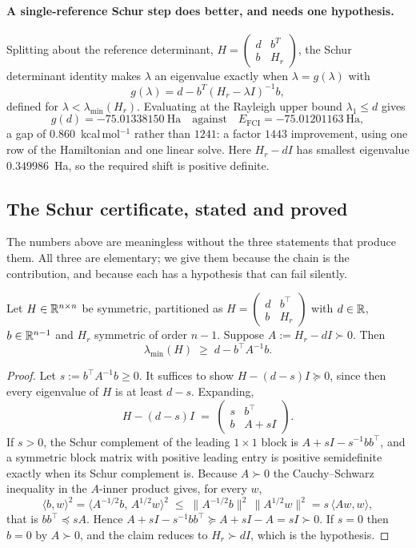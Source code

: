 \paragraph{A single-reference Schur step does better, and needs one hypothesis.}
Splitting about the reference determinant, $H = \begin{pmatrix} d & b^T\\
b & H_r\end{pmatrix}$, the Schur determinant identity makes $\lambda$ an
eigenvalue exactly when $\lambda = g(\lambda)$ with
\[
  g(\lambda) = d - b^T (H_r-\lambda I)^{-1} b ,
\]
defined for $\lambda<\lambda_{\min}(H_r)$. Evaluating at the Rayleigh upper bound
$\lambda_1\le d$ gives
\[
  g(d) = -75.01338150\ \text{Ha}
  \quad\text{against}\quad
  E_{\mathrm{FCI}} = -75.01201163\ \text{Ha},
\]
a gap of $0.860$~kcal\,mol$^{-1}$ rather than $1241$: a factor $1443$ improvement,
using one row of the Hamiltonian and one linear solve. Here
$H_r-dI$ has smallest eigenvalue $0.349986$~Ha, so the required shift is positive
definite.

\subsection{The Schur certificate, stated and proved}
\label{sec:schur-proof}

The numbers above are meaningless without the three statements that produce them.
All three are elementary; we give them because the chain is the contribution, and
because each has a hypothesis that can fail silently.

\begin{proposition}
\label{prop:schur}
Let $H\in\mathbb{R}^{n\times n}$ be symmetric, partitioned as
$H=\begin{pmatrix} d & b^\top\\ b & H_r\end{pmatrix}$ with $d\in\mathbb{R}$,
$b\in\mathbb{R}^{n-1}$ and $H_r$ symmetric of order $n-1$. Suppose
$A := H_r - dI \succ 0$. Then
\[
  \lambda_{\min}(H) \;\ge\; d - b^\top A^{-1} b .
\]
\end{proposition}
\begin{proof}
Let $s := b^\top A^{-1}b \ge 0$. It suffices to show $H-(d-s)I \succeq 0$, since then
every eigenvalue of $H$ is at least $d-s$. Expanding,
\[
  H-(d-s)I \;=\;
  \begin{pmatrix} s & b^\top\\ b & A+sI\end{pmatrix}.
\]
If $s>0$, the Schur complement of the leading $1\times1$ block is
$A+sI - s^{-1}bb^\top$, and a symmetric block matrix with positive leading entry is
positive semidefinite exactly when its Schur complement is. Because $A\succ0$ the
Cauchy--Schwarz inequality in the $A$-inner product gives, for every $w$,
\[
  \langle b,w\rangle^{2}
  = \langle A^{-1/2}b,\,A^{1/2}w\rangle^{2}
  \;\le\; \|A^{-1/2}b\|^{2}\,\|A^{1/2}w\|^{2}
  = s\,\langle Aw,w\rangle,
\]
that is $bb^\top \preceq sA$. Hence
$A+sI-s^{-1}bb^\top \succeq A+sI-A = sI \succ 0$. If $s=0$ then $b=0$ by
$A\succ0$, and the claim reduces to $H_r\succ dI$, which is the hypothesis.
\end{proof}

